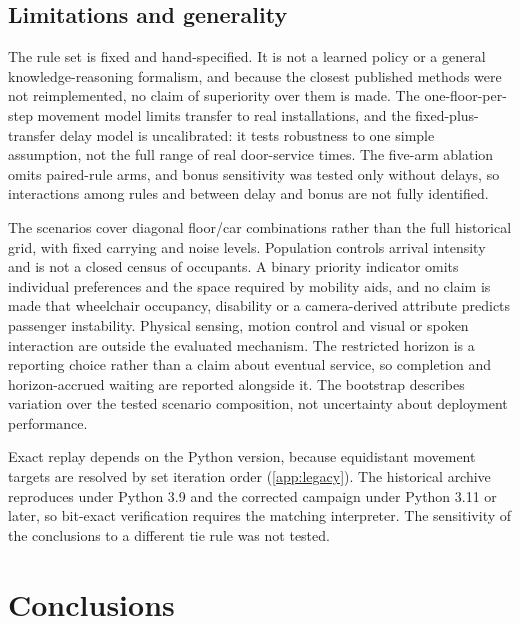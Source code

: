 \subsection{Limitations and generality}\label{limitations-and-generality}

The rule set is fixed and hand-specified. It is not a learned policy or a general knowledge-reasoning formalism, and because the closest published methods \cite{ref1,ref3,ref5} were not reimplemented, no claim of superiority over them is made. The one-floor-per-step movement model limits transfer to real installations, and the fixed-plus-transfer delay model is uncalibrated: it tests robustness to one simple assumption, not the full range of real door-service times. The five-arm ablation omits paired-rule arms, and bonus sensitivity was tested only without delays, so interactions among rules and between delay and bonus are not fully identified.

The scenarios cover diagonal floor/car combinations rather than the full historical grid, with fixed carrying and noise levels. Population controls arrival intensity and is not a closed census of occupants. A binary priority indicator omits individual preferences and the space required by mobility aids, and no claim is made that wheelchair occupancy, disability or a camera-derived attribute predicts passenger instability. Physical sensing, motion control and visual or spoken interaction are outside the evaluated mechanism. The restricted horizon is a reporting choice rather than a claim about eventual service, so completion and horizon-accrued waiting are reported alongside it. The bootstrap describes variation over the tested scenario composition, not uncertainty about deployment performance.

Exact replay depends on the Python version, because equidistant movement targets are resolved by set iteration order (\ref{app:legacy}). The historical archive reproduces under Python 3.9 and the corrected campaign under Python 3.11 or later, so bit-exact verification requires the matching interpreter. The sensitivity of the conclusions to a different tie rule was not tested.

\section{Conclusions}\label{conclusions}

